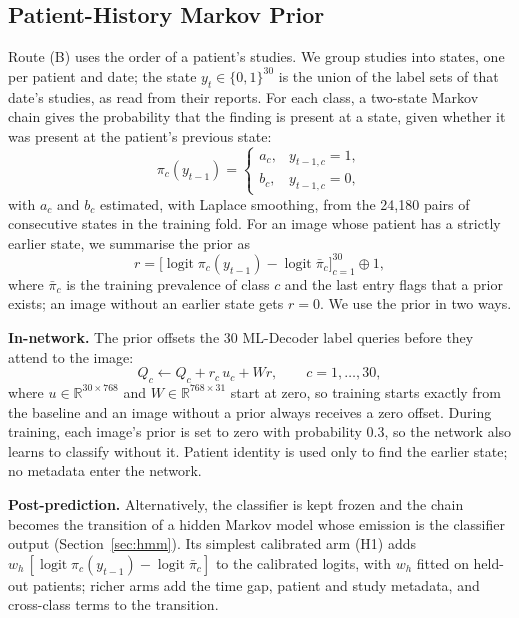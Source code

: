 \documentclass[conference]{IEEEtran}
\begin{document}
\subsection{Patient-History Markov Prior}
\label{sec:phprior}
Route (B) uses the order of a patient's studies. We group studies into states, one per patient and date; the state $y_t \in \{0,1\}^{30}$ is the union of the label sets of that date's studies, as read from their reports. For each class, a two-state Markov chain gives the probability that the finding is present at a state, given whether it was present at the patient's previous state:
\begin{equation}
\pi_c(y_{t-1}) = \begin{cases} a_c, & y_{t-1,c} = 1,\\ b_c, & y_{t-1,c} = 0, \end{cases}
\label{eq:chain}
\end{equation}
with $a_c$ and $b_c$ estimated, with Laplace smoothing, from the 24,180 pairs of consecutive states in the training fold. For an image whose patient has a strictly earlier state, we summarise the prior as
\begin{equation}
r = \bigl[\operatorname{logit} \pi_c(y_{t-1}) - \operatorname{logit} \bar\pi_c\bigr]_{c=1}^{30} \oplus 1,
\label{eq:rvec}
\end{equation}
where $\bar\pi_c$ is the training prevalence of class $c$ and the last entry flags that a prior exists; an image without an earlier state gets $r = 0$. We use the prior in two ways.

\textbf{In-network.} The prior offsets the 30 ML-Decoder label queries before they attend to the image:
\begin{equation}
Q_c \leftarrow Q_c + r_c\, u_c + W r, \qquad c = 1, \dots, 30,
\label{eq:qprior}
\end{equation}
where $u \in \mathbb{R}^{30 \times 768}$ and $W \in \mathbb{R}^{768 \times 31}$ start at zero, so training starts exactly from the baseline and an image without a prior always receives a zero offset. During training, each image's prior is set to zero with probability 0.3, so the network also learns to classify without it. Patient identity is used only to find the earlier state; no metadata enter the network.

\textbf{Post-prediction.} Alternatively, the classifier is kept frozen and the chain becomes the transition of a hidden Markov model whose emission is the classifier output (Section~\ref{sec:hmm}). Its simplest calibrated arm (H1) adds $w_h\,[\operatorname{logit} \pi_c(y_{t-1}) - \operatorname{logit} \bar\pi_c]$ to the calibrated logits, with $w_h$ fitted on held-out patients; richer arms add the time gap, patient and study metadata, and cross-class terms to the transition.
\end{document}
